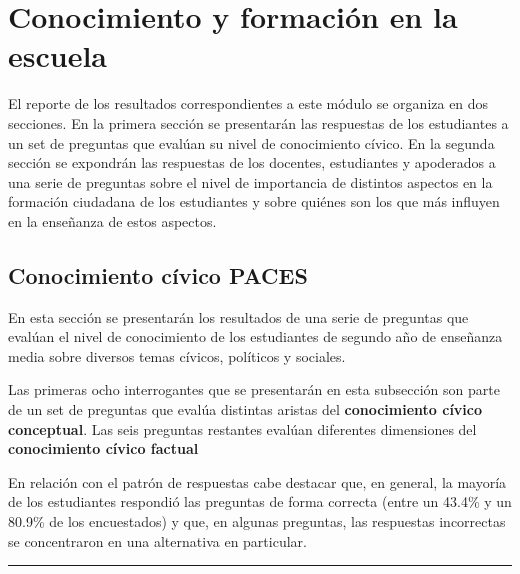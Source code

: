 \documentclass[
  14pt,
]{book}
\begin{document}
\hypertarget{conocimiento-y-formaciuxf3n-en-la-escuela}{%
\chapter{Conocimiento y formación en la escuela}\label{conocimiento-y-formaciuxf3n-en-la-escuela}}

El reporte de los resultados correspondientes a este módulo se organiza en dos secciones. En la primera sección se presentarán las respuestas de los estudiantes a un set de preguntas que evalúan su nivel de conocimiento cívico. En la segunda sección se expondrán las respuestas de los docentes, estudiantes y apoderados a una serie de preguntas sobre el nivel de importancia de distintos aspectos en la formación ciudadana de los estudiantes y sobre quiénes son los que más influyen en la enseñanza de estos aspectos.

\hypertarget{conocimiento-cuxedvico-paces}{%
\section{Conocimiento cívico PACES}\label{conocimiento-cuxedvico-paces}}

En esta sección se presentarán los resultados de una serie de preguntas que evalúan el nivel de conocimiento de los estudiantes de segundo año de enseñanza media sobre diversos temas cívicos, políticos y sociales.

Las primeras ocho interrogantes que se presentarán en esta subsección son parte de un set de preguntas que evalúa distintas aristas del \textbf{conocimiento cívico conceptual}. Las seis preguntas restantes evalúan diferentes dimensiones del \textbf{conocimiento cívico factual}

En relación con el patrón de respuestas cabe destacar que, en general, la mayoría de los estudiantes respondió las preguntas de forma correcta (entre un 43.4\% y un 80.9\% de los encuestados) y que, en algunas preguntas, las respuestas incorrectas se concentraron en una alternativa en particular.

\begin{center}\rule{0.5\linewidth}{0.5pt}\end{center}
\end{document}
